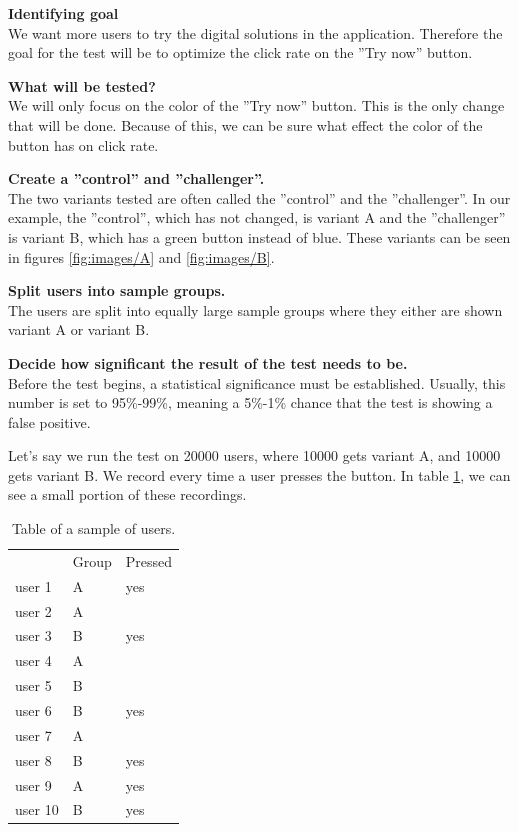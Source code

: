 \textbf{Identifying goal} \\
We want more users to try the digital solutions in the application. Therefore the goal for the test will be to optimize the click rate on the ''Try now'' button.

\textbf{What will be tested?}\\
We will only focus on the color of the ''Try now'' button. This is the only change that will be done. Because of this, we can be sure what effect the color of the button has on click rate. 

\textbf{Create a ''control'' and ''challenger''. }\\
The two variants tested are often called the ''control'' and the ''challenger''. In our example, the ''control'', which has not changed, is variant A and the ''challenger'' is variant B, which has a green button instead of blue. These variants can be seen in figures \ref{fig:images/A} and \ref{fig:images/B}.

\textbf{Split users into sample groups.}\\
The users are split into equally large sample groups where they either are shown variant A or variant B. 

\textbf{Decide how significant the result of the test needs to be.}\\
Before the test begins, a statistical significance must be established. Usually, this number is set to 95\%-99\%, meaning a 5\%-1\% chance that the test is showing a false positive. 

Let's say we run the test on 20000 users, where 10000 gets variant A, and 10000 gets variant B. We record every time a user presses the button. In table \ref{tab:ab}, we can see a small portion of these recordings.

\begin{table}[H]
  \centering
\begin{tabular}{|l|l|l|}
\cline{1-3} 
        & Group & Pressed \\\cline{1-3} 
user 1  & A     & yes     \\\cline{1-3} 
user 2  & A     &         \\\cline{1-3} 
user 3  & B     & yes     \\\cline{1-3} 
user 4  & A     &         \\\cline{1-3} 
user 5  & B     &         \\\cline{1-3} 
user 6  & B     & yes     \\\cline{1-3} 
user 7  & A     &         \\\cline{1-3} 
user 8  & B     & yes     \\\cline{1-3} 
user 9  & A     & yes     \\\cline{1-3} 
user 10 & B     & yes     \\\cline{1-3}  
\end{tabular}
\caption{Table of a sample of users.}
\label{tab:ab}
\end{table}

